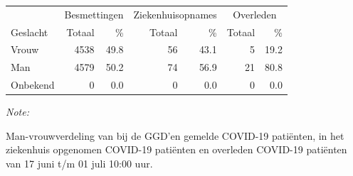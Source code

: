 \documentclass[
  english,
  man,floatsintext]{apa6}
\begin{document}
\begin{table}
\centering\begingroup\fontsize{11}{13}\selectfont

\begin{threeparttable}
\begin{tabular}{lrrrrrr}
\toprule
\multicolumn{1}{c}{ } & \multicolumn{2}{c}{Besmettingen} & \multicolumn{2}{c}{Ziekenhuisopnames} & \multicolumn{2}{c}{Overleden} \\
\cmidrule(l{3pt}r{3pt}){2-3} \cmidrule(l{3pt}r{3pt}){4-5} \cmidrule(l{3pt}r{3pt}){6-7}
Geslacht & Totaal & \% & Totaal & \% & Totaal & \%\\
\midrule
Vrouw & 4538 & 49.8 & 56 & 43.1 & 5 & 19.2\\
Man & 4579 & 50.2 & 74 & 56.9 & 21 & 80.8\\
Onbekend & 0 & 0.0 & 0 & 0.0 & 0 & 0.0\\
\bottomrule
\end{tabular}
\begin{tablenotes}
\item \textit{Note: } 
\item Man-vrouwverdeling van bij de GGD’en gemelde COVID-19 patiënten, in het ziekenhuis opgenomen COVID-19 patiënten en overleden COVID-19 patiënten van 17 juni t/m 01 juli 10:00 uur.
\end{tablenotes}
\end{threeparttable}
\endgroup{}
\end{table}
\newpage
\end{document}
